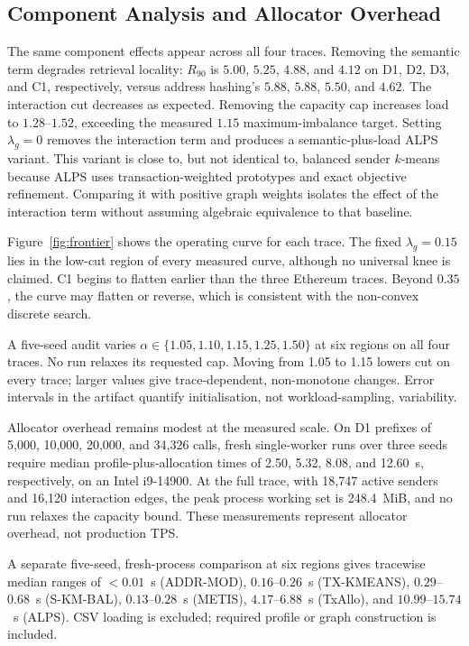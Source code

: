 \documentclass[runningheads]{llncs}
\begin{document}
\subsection{Component Analysis and Allocator Overhead}
\label{sec:components}

The same component effects appear across all four traces. Removing the semantic
term degrades retrieval locality: $R_{90}$ is $5.00$, $5.25$, $4.88$, and
$4.12$ on D1, D2, D3, and C1, respectively, versus address hashing's $5.88$,
$5.88$, $5.50$, and $4.62$. The interaction cut decreases as expected.
Removing the capacity cap increases load to $1.28$--$1.52$, exceeding
the measured $1.15$ maximum-imbalance target. Setting $\lambda_g=0$ removes the
interaction term and produces a semantic-plus-load ALPS variant. This variant is
close to, but not identical to, balanced sender $k$-means because ALPS uses
transaction-weighted prototypes and exact objective refinement. Comparing it
with positive graph weights isolates the effect of the interaction term without
assuming algebraic equivalence to that baseline.

Figure~\ref{fig:frontier} shows the operating curve for each trace. The fixed
$\lambda_g=0.15$ lies in the low-cut region of every measured curve, although no
universal knee is claimed. C1 begins to flatten earlier than the three Ethereum
traces. Beyond $0.35$, the curve may flatten or reverse, which is consistent
with the non-convex discrete search.

A five-seed audit varies $\alpha\in\{1.05,1.10,1.15,1.25,1.50\}$ at six
regions on all four traces. No run relaxes its requested cap. Moving from 1.05
to 1.15 lowers cut on every trace; larger values give trace-dependent,
non-monotone changes. Error intervals in the artifact quantify initialisation,
not workload-sampling, variability.

Allocator overhead remains modest at the measured scale. On D1 prefixes of
5,000, 10,000, 20,000, and 34,326 calls, fresh single-worker runs over three
seeds require median profile-plus-allocation times of 2.50, 5.32, 8.08, and
12.60~s, respectively, on an Intel i9-14900. At the full trace, with 18,747
active senders and 16,120 interaction edges, the peak process working set is
248.4~MiB, and no run relaxes the capacity bound. These measurements represent
allocator overhead, not production TPS.

A separate five-seed, fresh-process comparison at six regions gives tracewise
median ranges of $<0.01$~s (ADDR-MOD), $0.16$--$0.26$~s (TX-KMEANS),
$0.29$--$0.68$~s (S-KM-BAL), $0.13$--$0.28$~s (METIS), $4.17$--$6.88$~s
(TxAllo), and $10.99$--$15.74$~s (ALPS). CSV loading is excluded; required
profile or graph construction is included.
\end{document}
